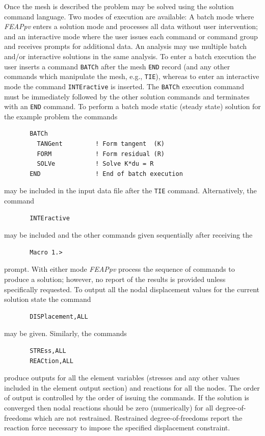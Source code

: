 Once the mesh is described the problem may be solved using
the solution command language.  Two modes of execution are available:
A batch mode where {\sl FEAPpv} enters a solution mode and processes all data
without user intervention; and an interactive mode where the user
issues each command or command group and receives prompts for additional data.
An analysis may use multiple batch and/or interactive solutions in the same
analysis.  To enter a batch execution the user inserts a command {\tt BATCh}
after the mesh {\tt END} record (and any other commands which manipulate
the mesh, e.g., {\tt TIE}), whereas to enter an interactive mode the
command {\tt INTEractive} is inserted.  The {\tt BATCh} execution command
must be immediately followed by the other solution commands and terminates
with an {\tt END} command.  To perform a batch mode
static (steady state) solution for the example problem the commands
\begin{verbatim}
       BATCh
         TANGent         ! Form tangent  (K)
         FORM            ! Form residual (R)
         SOLVe           ! Solve K*du = R
       END               ! End of batch execution
\end{verbatim}
may be included in the input data file after the {\tt TIE} command.
Alternatively, the command
\begin{verbatim}
       INTEractive
\end{verbatim}
may be included and the other commands given sequentially after receiving
the
\begin{verbatim}
       Macro 1.>
\end{verbatim}
prompt.  With either mode {\sl FEAPpv} process the sequence of commands to produce
a solution; however, no report of the results is provided unless specifically
requested.  To output all the nodal displacement values for the current
solution state the command
\begin{verbatim}
       DISPlacement,ALL
\end{verbatim}
may be given.  Similarly, the commands
\begin{verbatim}
       STREss,ALL
       REACtion,ALL
\end{verbatim}
produce outputs for all the element variables (stresses and any other values
included in the element output section) and reactions for all the nodes.
The order of output is controlled by the order of issuing the commands.  If the
solution is converged then nodal reactions should be zero (numerically) for
all degree-of-freedoms which are not restrained.  Restrained degree-of-freedoms
report the reaction force necessary to impose the specified
displacement constraint.

